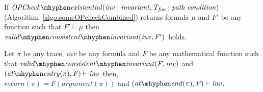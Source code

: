 \documentclass{llncs}
\newcommand{\foo}{\textit{foo}}
\newcommand{\trace}{\pi}
\newcommand{\inv}{\mathit{inv}}
\newcommand{\pathCondition}{\mathit{T_{\foo}}}
\newcommand{\OPCheckE}{\mathit{OPCheck \mhyphen existential}}
\newcommand{\mi}[1]{\mathit{#1}}
\newcommand{\F}{\mathit{F}}
\newcommand{\satisfies}{\vdash}
\newcommand{\formula}{\mu}
\newcommand{\vci}[2]{\mathit{valid \mhyphen consistent \mhyphen
    invariant(#1, #2)}}
\newcommand{\atEntry}[1]{\mathit{at \mhyphen entry(#1)}}
\newcommand{\return}[1]{\mathit{return(#1)}}
\newcommand{\atEnd}[1]{\mathit{at \mhyphen end(#1)}}
\newcommand{\param}[1]{\mathit{argument(#1)}}
\begin{document}
\begin{lemma}\label{lemma:interface}
  If $\OPCheckE\mi{(\inv : invariant, \pathCondition : path \;
    condition)}$ (Algorithm~\ref{algo:someOPcheckCombined}) returns
  formula $\formula$ and $\F'$ be any function such that $\F'
  \satisfies \formula$ then\\ $\vci{\inv}{\F'}$ holds.
\end{lemma}


\begin{lemma} \label{lemma:trace}
Let $\trace$ be any trace, $\inv$ be any formula and $\F$ be any
mathematical function such that $\vci{\F}{\inv}$ and
$(\atEntry{\trace}, \F) \satisfies \inv$ then,\\ $\return{\trace} =
\F(\param{\trace})$ and $(\atEnd{\trace}, \F) \satisfies \inv$.
\end{lemma}
\end{document}
